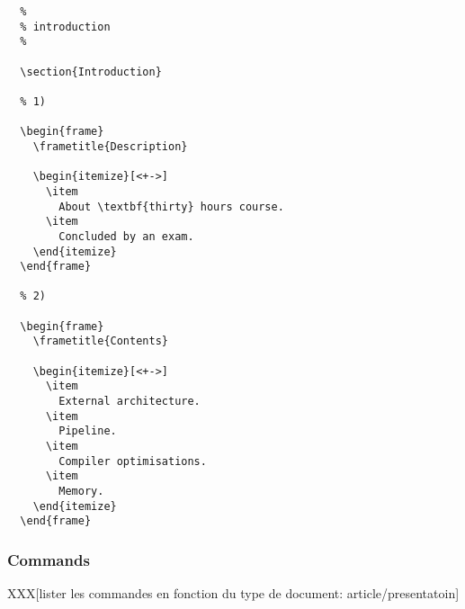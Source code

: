 \begin{verbatim}
  %
  % introduction
  %

  \section{Introduction}

  % 1)

  \begin{frame}
    \frametitle{Description}

    \begin{itemize}[<+->]
      \item
        About \textbf{thirty} hours course.
      \item
        Concluded by an exam.
    \end{itemize}
  \end{frame}

  % 2)

  \begin{frame}
    \frametitle{Contents}

    \begin{itemize}[<+->]
      \item
        External architecture.
      \item
        Pipeline.
      \item
        Compiler optimisations.
      \item
        Memory.
    \end{itemize}
  \end{frame}
\end{verbatim}


\subsubsection{Commands}

XXX[lister les commandes en fonction du type de document: article/presentatoin]
